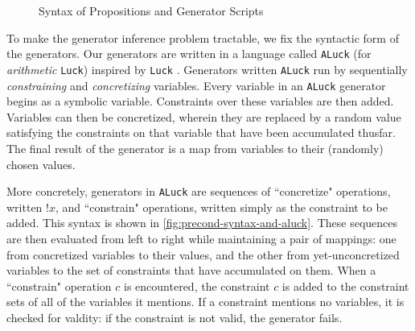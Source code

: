 \documentclass[sigconf,nonacm]{acmart}
\begin{document}
\begin{figure}
\vspace{-10px}
\caption{Syntax of Propositions and Generator Scripts}
\label{fig:precond-syntax-and-aluck}

\vspace{-15px}
\end{figure}

To make the generator inference problem tractable, we fix the
syntactic form of the generators. Our generators are written
in a language called \texttt{ALuck} (for \textit{arithmetic} \texttt{Luck})
inspired by \texttt{Luck} \cite{luck}. Generators written \texttt{ALuck} run by sequentially \textit{constraining} and
\textit{concretizing} variables. Every variable in an \texttt{ALuck} generator
begins as a symbolic variable. Constraints over these variables are then added.
Variables can then be concretized, wherein they are replaced by a random value
satisfying the constraints on that variable that have been accumulated thusfar.
The final result of the generator is a map from variables to their (randomly)
chosen values.

More concretely, generators in \texttt{ALuck} are sequences of ``concretize"
operations, written $!x$, and ``constrain" operations, written simply as the
constraint to be added. This syntax is shown in
\autoref{fig:precond-syntax-and-aluck}. These sequences are then evaluated from left to
right while maintaining a pair of mappings: one from concretized variables to
their values, and the other from yet-unconcretized variables to the set of
constraints that have accumulated on them.  When a ``constrain" operation $c$ is
encountered, the constraint $c$ is added to the constraint sets of all of the
variables it mentions. If a constraint mentions no variables, it is checked for
valdity: if the constraint is not valid, the generator fails.
\end{document}
